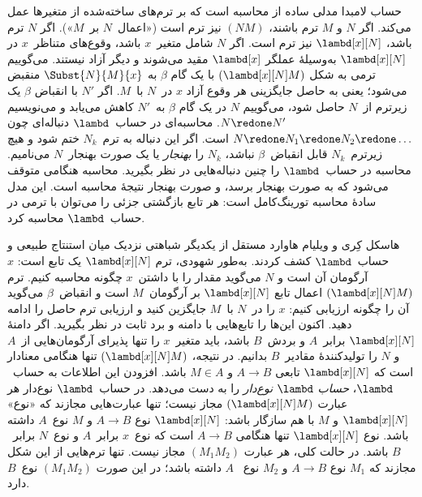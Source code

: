 \documentclass[../../../include/open-logic-section]{subfiles}
\begin{document}


حساب لامبدا مدلی ساده از محاسبه است که بر ترم‌های ساخته‌شده از
متغیرها عمل می‌کند. اگر $N$ و $M$ ترم باشند، $(NM)$ نیز ترم است
(«اعمال~$N$ بر~$M$»). اگر $N$ ترم باشد، $\lambd[x][N]$ نیز ترم است.
اگر $N$ شامل متغیر~$x$ باشد، وقوع‌های متناظر~$x$ در $\lambd[x][N]$
به‌وسیلهٔ عملگر $\lambd[x]$ مقید می‌شوند و دیگر آزاد نیستند. می‌گوییم
ترمی به شکل $(\lambd[x][N]M)$ با یک گام $\beta$ به
$\Subst{N}{M}{x}$ منقبض می‌شود؛ یعنی به حاصل جایگزینی هر وقوع آزاد
$x$ در~$N$ با~$M$. اگر $N'$ با انقباض $\beta$ یک زیرترم از~$N$ حاصل
شود، می‌گوییم $N$ در یک گام $\beta$ به~$N'$ کاهش می‌یابد و می‌نویسیم
$N \redone N'$. محاسبه‌ای در حساب~$\lambd$ دنباله‌ای چون
$N \redone N_1 \redone N_2 \redone \dots$ است. اگر این دنباله به
ترم~$N_k$ ختم شود و هیچ زیرترم~$N_k$ قابل انقباض~$\beta$ نباشد،
$N_k$ را \emph{بهنجار} یا یک صورت بهنجار~$N$ می‌نامیم. محاسبه در
حساب~$\lambd$ را چنین دنباله‌هایی در نظر بگیرید. محاسبه هنگامی متوقف
می‌شود که به صورت بهنجار برسد، و صورت بهنجار نتیجهٔ محاسبه است. این
مدل سادهٔ محاسبه تورینگ‌کامل است: هر تابع بازگشتی جزئی را می‌توان با
ترمی در حساب~$\lambd$ محاسبه کرد.

هاسکل کِری و ویلیام هاوارد مستقل از یکدیگر شباهتی نزدیک میان استنتاج
طبیعی و حساب~$\lambd$ کشف کردند. به‌طور شهودی، ترم
$\lambd[x][N]$ یک تابع است: $x$ آرگومان آن است و $N$ می‌گوید مقدار را
با داشتن~$x$ چگونه محاسبه کنیم. ترم $(\lambd[x][N]M)$ اعمال تابع
$\lambd[x][N]$ بر آرگومان~$M$ است و انقباض~$\beta$ می‌گوید آن را
چگونه ارزیابی کنیم: $x$ را در~$N$ با~$M$ جایگزین کنید و ارزیابی ترم
حاصل را ادامه دهید. اکنون این‌ها را تابع‌هایی با دامنه و برد ثابت
در نظر بگیرید. اگر دامنهٔ $\lambd[x][N]$ برابر~$A$ و بردش~$B$ باشد،
باید متغیر~$x$ را تنها پذیرای آرگومان‌هایی از~$A$ و $N$ را تولیدکنندهٔ
مقادیر~$B$ بدانیم. در نتیجه، $(\lambd[x][N]M)$ تنها هنگامی معنادار
است که $\lambd[x][N]$ تابعی $A \to B$ و $M \in A$ باشد. افزودن این
اطلاعات به حساب~$\lambd$، \emph{حساب $\lambd$ نوع‌دار} را به دست
می‌دهد. در حساب~$\lambd$ نوع‌دار هر عبارت $(\lambd[x][N]M)$ مجاز
نیست؛ تنها عبارت‌هایی مجازند که «نوع» $\lambd[x][N]$ و $M$ با هم
سازگار باشد: $\lambd[x][N]$ نوع $A \to B$ و $M$ نوع~$A$ داشته باشد.
نوع $\lambd[x][N]$ تنها هنگامی $A \to B$ است که نوع~$x$ برابر~$A$ و
نوع~$N$ برابر~$B$ باشد. در حالت کلی، هر عبارت $(M_1M_2)$ مجاز نیست.
تنها ترم‌هایی از این شکل مجازند که $M_1$ نوع $A \to B$ و $M_2$ نوع
~$A$ داشته باشد؛ در این صورت $(M_1M_2)$ نوع~$B$ دارد.
\end{document}
